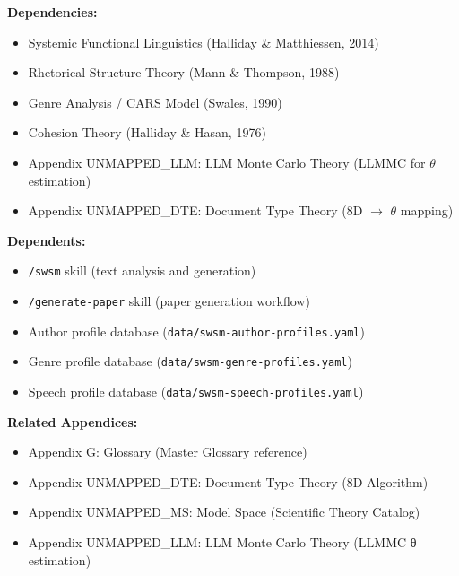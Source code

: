 \begin{tcolorbox}[colback=gray!5!white, colframe=gray!75!black, title=Cross-Reference Map]
\textbf{Dependencies:}
\begin{itemize}
    \item Systemic Functional Linguistics (Halliday \& Matthiessen, 2014)
    \item Rhetorical Structure Theory (Mann \& Thompson, 1988)
    \item Genre Analysis / CARS Model (Swales, 1990)
    \item Cohesion Theory (Halliday \& Hasan, 1976)
    \item Appendix UNMAPPED_LLM: LLM Monte Carlo Theory (LLMMC for $\theta$ estimation)
    \item Appendix UNMAPPED_DTE: Document Type Theory (8D $\rightarrow$ $\theta$ mapping)
\end{itemize}

\textbf{Dependents:}
\begin{itemize}
    \item \texttt{/swsm} skill (text analysis and generation)
    \item \texttt{/generate-paper} skill (paper generation workflow)
    \item Author profile database (\texttt{data/swsm-author-profiles.yaml})
    \item Genre profile database (\texttt{data/swsm-genre-profiles.yaml})
    \item Speech profile database (\texttt{data/swsm-speech-profiles.yaml})
\end{itemize}

\textbf{Related Appendices:}
\begin{itemize}
    \item Appendix G: Glossary (Master Glossary reference)
    \item Appendix UNMAPPED_DTE: Document Type Theory (8D Algorithm)
    \item Appendix UNMAPPED_MS: Model Space (Scientific Theory Catalog)
    \item Appendix UNMAPPED_LLM: LLM Monte Carlo Theory (LLMMC θ estimation)
\end{itemize}
\end{tcolorbox}


